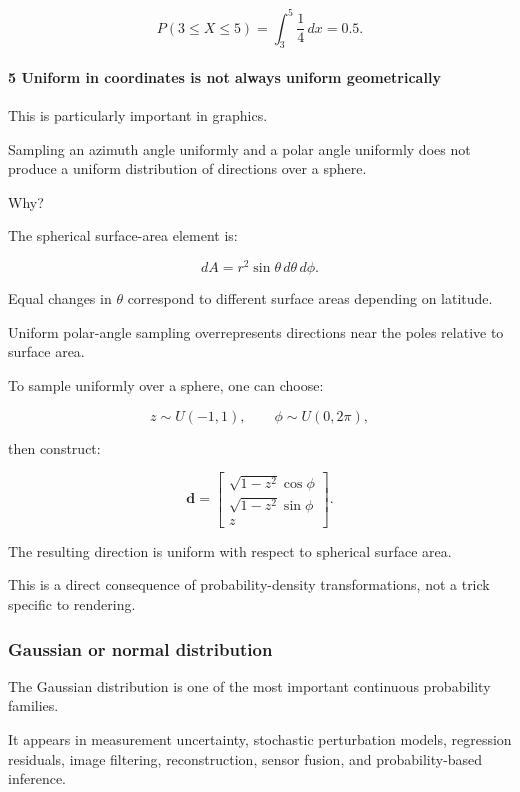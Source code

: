 \[
 P(3\le X\le5) = \int_3^5\frac14\,dx =\boxed{0.5}.
\]

\paragraph{5 Uniform in coordinates is not always uniform geometrically}\label{uniform-in-coordinates-is-not-always-uniform-geometrically}

This is particularly important in graphics.

Sampling an azimuth angle uniformly and a polar angle uniformly does not produce a uniform distribution of directions over a sphere.

Why?

The spherical surface-area element is:

\[
 dA=r^2\sin\theta\,d\theta\,d\phi.
\]

Equal changes in \(\theta\) correspond to different surface areas depending on latitude.

Uniform polar-angle sampling overrepresents directions near the poles relative to surface area.

To sample uniformly over a sphere, one can choose:

\[
 z\sim U(-1,1), \qquad \phi\sim U(0,2\pi),
\]

then construct:

\[
 \mathbf d= \begin{bmatrix} \sqrt{1-z^2}\cos\phi\\ \sqrt{1-z^2}\sin\phi\\ z \end{bmatrix}.
\]

The resulting direction is uniform with respect to spherical surface area.

This is a direct consequence of probability-density transformations, not a trick specific to rendering.

\subsubsection{Gaussian or normal distribution}\label{gaussian-or-normal-distribution}

The Gaussian distribution is one of the most important continuous probability families.

It appears in measurement uncertainty, stochastic perturbation models, regression residuals, image filtering, reconstruction, sensor fusion, and probability-based inference.

